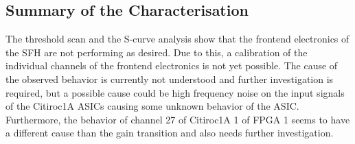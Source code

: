 \subsection{Summary of the Characterisation}
The threshold scan and the S-curve analysis show that the frontend electronics of the SFH are not performing as desired.
Due to this, a calibration of the individual channels of the frontend electronics is not yet possible.
The cause of the observed behavior is currently not understood and further investigation is required,
but a possible cause could be high frequency noise on the input signals of the Citiroc1A ASICs causing some unknown behavior of the ASIC.
Furthermore, the behavior of channel 27 of Citiroc1A 1 of FPGA 1 seems to have a different cause than the gain transition and also needs further investigation.

